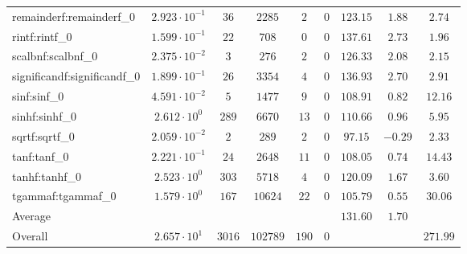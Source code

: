 \begin{tabular}{|l|c|c|c|c|c|c|c|c|}
remainderf:remainderf\_0     & $ 2.923 \cdot 10^{-1} $ & $ 36     $ & $ 2285   $ & $ 2   $ & $ 0   $ & $ 123.15      $ & $ 1.88    $ & $ 2.74    $ \\
rintf:rintf\_0               & $ 1.599 \cdot 10^{-1} $ & $ 22     $ & $ 708    $ & $ 0   $ & $ 0   $ & $ 137.61      $ & $ 2.73    $ & $ 1.96    $ \\
scalbnf:scalbnf\_0           & $ 2.375 \cdot 10^{-2} $ & $ 3      $ & $ 276    $ & $ 2   $ & $ 0   $ & $ 126.33      $ & $ 2.08    $ & $ 2.15    $ \\
significandf:significandf\_0 & $ 1.899 \cdot 10^{-1} $ & $ 26     $ & $ 3354   $ & $ 4   $ & $ 0   $ & $ 136.93      $ & $ 2.70    $ & $ 2.91    $ \\
sinf:sinf\_0                 & $ 4.591 \cdot 10^{-2} $ & $ 5      $ & $ 1477   $ & $ 9   $ & $ 0   $ & $ 108.91      $ & $ 0.82    $ & $ 12.16   $ \\
sinhf:sinhf\_0               & $ 2.612 \cdot 10^{0}  $ & $ 289    $ & $ 6670   $ & $ 13  $ & $ 0   $ & $ 110.66      $ & $ 0.96    $ & $ 5.95    $ \\
sqrtf:sqrtf\_0               & $ 2.059 \cdot 10^{-2} $ & $ 2      $ & $ 289    $ & $ 2   $ & $ 0   $ & $ 97.15       $ & $ -0.29   $ & $ 2.33    $ \\
tanf:tanf\_0                 & $ 2.221 \cdot 10^{-1} $ & $ 24     $ & $ 2648   $ & $ 11  $ & $ 0   $ & $ 108.05      $ & $ 0.74    $ & $ 14.43   $ \\
tanhf:tanhf\_0               & $ 2.523 \cdot 10^{0}  $ & $ 303    $ & $ 5718   $ & $ 4   $ & $ 0   $ & $ 120.09      $ & $ 1.67    $ & $ 3.60    $ \\
tgammaf:tgammaf\_0           & $ 1.579 \cdot 10^{0}  $ & $ 167    $ & $ 10624  $ & $ 22  $ & $ 0   $ & $ 105.79      $ & $ 0.55    $ & $ 30.06   $ \\
\hline
Average                      & $                     $ & $        $ & $        $ & $     $ & $     $ & $ 131.60      $ & $ 1.70    $ & $         $ \\
\hline
Overall                      & $ 2.657 \cdot 10^{1}  $ & $ 3016   $ & $ 102789 $ & $ 190 $ & $ 0   $ & $             $ & $         $ & $ 271.99  $ \\
\hline
\end{tabular}
